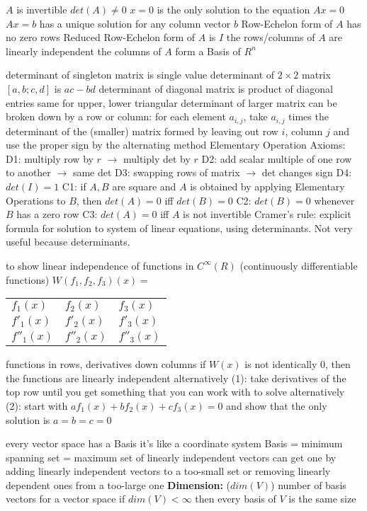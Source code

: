 \documentclass[12pt]{article}
\begin{document}
\begin{multicols*}{2}
\begin{flushleft}
\begin{outline}[longenum]
  \1 $A$ is invertible
  \1 $det(A) \not= 0$
  \1 $x=0$ is the only solution to the equation $Ax=0$
  \1 $Ax=b$ has a unique solution for any column vector $b$
  \1 Row-Echelon form of $A$ has no zero rows
  \1 Reduced Row-Echelon form of $A$ is $I$
  \1 the rows/columns of $A$ are linearly independent
  \1 the columns of $A$ form a Basis of $R^n$


  \1 determinant of singleton matrix is single value
  \1 determinant of $2\times 2$ matrix $[a,b;c,d]$ is $ac-bd$
  \1 determinant of diagonal matrix is product of diagonal entries
    \2 same for upper, lower triangular
  \1 determinant of larger matrix can be broken down by a row or column:
    \2 for each element $a_{i,j}$, take $a_{i,j}$ times the determinant of  the (smaller) matrix formed by leaving out row $i$, column $j$
    \2 and use the proper sign by the alternating method
  \1 Elementary Operation Axioms:
    \2 D1: multiply row by $r$ $\rightarrow$ multiply det by $r$
    \2 D2: add scalar multiple of one row to another $\rightarrow$ same det
    \2 D3: swapping rows of matrix $\rightarrow$ det changes sign
    \2 D4: $det(I) = 1$
    \2 C1: if $A,B$ are square and $A$ is obtained by applying Elementary Operations to $B$, then $det(A)=0$ iff $det(B)=0$
    \2 C2: $det(B)=0$ whenever $B$ has a zero row
    \2 C3: $det(A)=0$ iff $A$ is not invertible
  \1 Cramer's rule: explicit formula for solution to system of linear equations, using determinants. Not very useful because determinants.

  \1 to show linear independence of functions in $C^{\infty}(R)$ (continuously differentiable functions)
  \1 $W(f_1,f_2,f_3)(x) = $
    \begin{tabular}{|l l l|}
      $f_1(x)$ & $f_2(x)$ & $f_3(x)$ \\
      $f'_1(x)$ & $f'_2(x)$ & $f'_3(x)$ \\
      $f''_1(x)$ & $f''_2(x)$ & $f''_3(x)$ \\
    \end{tabular}
      \2 functions in rows, derivatives down columns
  \1 if $W(x)$ is not identically $0$, then the functions are linearly independent
  \1 alternatively (1): take derivatives of the top row until you get something that you can work with to solve
  \1 alternatively (2): start with $af_1(x)+bf_2(x)+cf_3(x)=0$ and show that the only solution is $a=b=c=0$


  \1 every vector space has a Basis
  \1 it's like a coordinate system
  \1 Basis = minimum spanning set = maximum set of linearly independent vectors
  \1 can get one by adding linearly independent vectors to a too-small set or removing linearly dependent ones from a too-large one
  \1 \textbf{Dimension:} ($dim(V)$) number of basis vectors for a vector space
    \2 if $dim(V)<\infty$ then every basis of $V$ is the same size


\end{outline}
\end{flushleft}
\end{multicols*}
\end{document}
